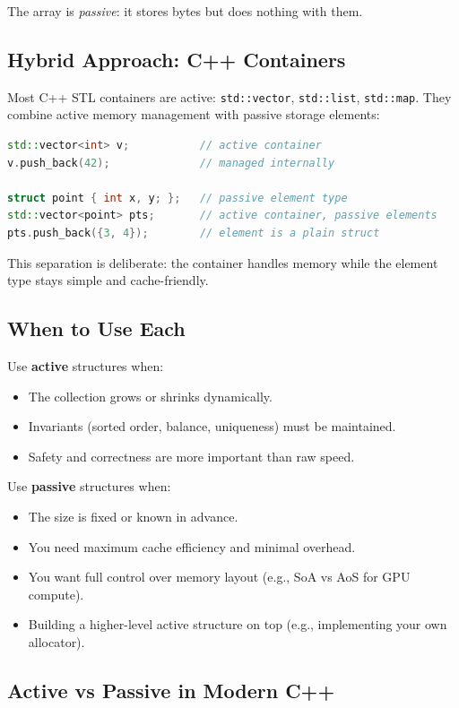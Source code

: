 The array is \emph{passive}: it stores bytes but does nothing with them.

\subsection{Hybrid Approach: C++ Containers}

Most C++ STL containers are active: \texttt{std::vector}, \texttt{std::list}, \texttt{std::map}. They combine active memory management with passive storage elements:

\begin{lstlisting}[language=C++]
std::vector<int> v;           // active container
v.push_back(42);              // managed internally

struct point { int x, y; };   // passive element type
std::vector<point> pts;       // active container, passive elements
pts.push_back({3, 4});        // element is a plain struct
\end{lstlisting}

This separation is deliberate: the container handles memory while the element type stays simple and cache-friendly.

\subsection{When to Use Each}

Use \textbf{active} structures when:
\begin{itemize}
\item The collection grows or shrinks dynamically.
\item Invariants (sorted order, balance, uniqueness) must be maintained.
\item Safety and correctness are more important than raw speed.
\end{itemize}

Use \textbf{passive} structures when:
\begin{itemize}
\item The size is fixed or known in advance.
\item You need maximum cache efficiency and minimal overhead.
\item You want full control over memory layout (e.g., SoA vs AoS for GPU compute).
\item Building a higher-level active structure on top (e.g., implementing your own allocator).
\end{itemize}

\subsection{Active vs Passive in Modern C++}

